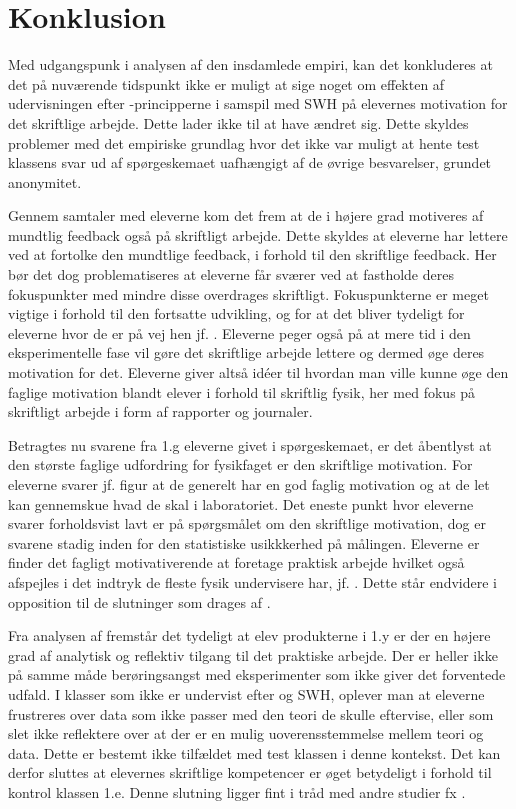 \chapter{Konklusion}
\label{Ch:6}

Med udgangspunk i analysen af den insdamlede empiri, kan det konkluderes at det på nuværende tidspunkt ikke er muligt at sige noget om effekten af udervisningen efter \ib{}-principperne i samspil med SWH på elevernes motivation for det skriftlige arbejde. Dette lader ikke til at have ændret sig. Dette skyldes problemer med det empiriske grundlag hvor det ikke var muligt at hente test klassens svar ud af spørgeskemaet uafhængigt af de øvrige besvarelser, grundet anonymitet.

Gennem samtaler med eleverne kom det frem at de i højere grad motiveres af mundtlig feedback også på skriftligt arbejde. Dette skyldes at eleverne har lettere ved at fortolke den mundtlige feedback, i forhold til den skriftlige feedback. Her bør det dog problematiseres at eleverne får sværer ved at fastholde deres fokuspunkter med mindre disse overdrages skriftligt. Fokuspunkterne er meget vigtige i forhold til den fortsatte udvikling, og for at det bliver tydeligt for eleverne hvor de er på vej hen jf. \citep{Hattie2015}. Eleverne peger også på at mere tid i den eksperimentelle fase vil gøre det skriftlige arbejde lettere og dermed øge deres motivation for det. 
Eleverne giver altså idéer til hvordan man ville kunne øge den faglige motivation blandt elever i forhold til skriftlig fysik, her med fokus på skriftligt arbejde i form af rapporter og journaler. 

Betragtes nu svarene fra 1.g eleverne givet i spørgeskemaet, er det åbentlyst at den største faglige udfordring for fysikfaget er den skriftlige motivation. For eleverne svarer jf. figur  at de generelt har en god faglig motivation og at de let kan gennemskue hvad de skal i laboratoriet. Det eneste punkt hvor eleverne svarer forholdsvist lavt er på spørgsmålet om den skriftlige motivation, dog er svarene stadig inden for den statistiske usikkkerhed på målingen. Eleverne er finder det fagligt motivativerende at foretage praktisk arbejde hvilket også afspejles i det indtryk de fleste fysik undervisere har, jf. \citep{Krogh2016}. Dette står endvidere i opposition til de slutninger som drages af \citep{Hodson2008}.

Fra analysen af fremstår det tydeligt at elev produkterne i 1.y er der en højere grad af analytisk og reflektiv tilgang til det praktiske arbejde. Der er heller ikke på samme måde berøringsangst med eksperimenter som ikke giver det forventede udfald. I klasser som ikke er undervist efter \ib{} og SWH, oplever man at eleverne frustreres over data som ikke passer med den teori de skulle eftervise, eller som slet ikke reflektere over at der er en mulig uoverensstemmelse mellem teori og data. Dette er bestemt ikke tilfældet med test klassen i denne kontekst. Det kan derfor sluttes at elevernes skriftlige kompetencer er øget betydeligt i forhold til kontrol klassen 1.e. Denne slutning ligger fint i tråd med andre studier fx \citep{Atasoy2013, Erkol2010, Burke2005}.


